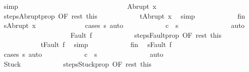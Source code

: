 \begin{isabellebody}
\ simp\isanewline
\ \ \ \ \ \ \ \ \ \ \isamarkupfalse%
\isanewline
\ \ \ \ \ \ \ \ \isamarkupfalse%
\isanewline
\ \ \ \ \ \ \ \ \ \ \isamarkupfalse%
\ {\isacharparenleft}Abrupt\ x{\isacharparenright}\isanewline
\ \ \ \ \ \ \ \ \ \ \isamarkupfalse%
\ steps{\isacharunderscore}Abrupt{\isacharunderscore}prop\ {\isacharbrackleft}OF\ rest\ this{\isacharbrackright}\isanewline
\ \ \ \ \ \ \ \ \ \ \isamarkupfalse%
\ {\isachardoublequoteopen}t{\isacharequal}Abrupt\ x{\isachardoublequoteclose}\ \isamarkupfalse%
\ simp\isanewline
\ \ \ \ \ \ \ \ \ \ \isamarkupfalse%
\ fin\ \isamarkupfalse%
\ {\isachardoublequoteopen}s{\isacharprime}{\isacharequal}Abrupt\ x{\isachardoublequoteclose}\isanewline
\ \ \ \ \ \ \ \ \ \ \ \ \isamarkupfalse%
\ {\isacharparenleft}cases\ s{\isacharprime}{\isacharparenright}\ auto\isanewline
\ \ \ \ \ \ \ \ \ \ \isamarkupfalse%
\ {\isachardoublequoteopen}{\isasymGamma}{\isasymturnstile}c\ {\isasymdown}\ s{\isacharprime}{\isachardoublequoteclose}\ \isanewline
\ \ \ \ \ \ \ \ \ \ \ \ \isamarkupfalse%
\ auto\isanewline
\ \ \ \ \ \ \ \ \isamarkupfalse%
\isanewline
\ \ \ \ \ \ \ \ \ \ \isamarkupfalse%
\ {\isacharparenleft}Fault\ f{\isacharparenright}\isanewline
\ \ \ \ \ \ \ \ \ \ \isamarkupfalse%
\ steps{\isacharunderscore}Fault{\isacharunderscore}prop\ {\isacharbrackleft}OF\ rest\ this{\isacharbrackright}\isanewline
\ \ \ \ \ \ \ \ \ \ \isamarkupfalse%
\ {\isachardoublequoteopen}t{\isacharequal}Fault\ f{\isachardoublequoteclose}\ \isamarkupfalse%
\ simp\isanewline
\ \ \ \ \ \ \ \ \ \ \isamarkupfalse%
\ fin\ \isamarkupfalse%
\ {\isachardoublequoteopen}s{\isacharprime}{\isacharequal}Fault\ f{\isachardoublequoteclose}\isanewline
\ \ \ \ \ \ \ \ \ \ \ \ \isamarkupfalse%
\ {\isacharparenleft}cases\ s{\isacharprime}{\isacharparenright}\ auto\isanewline
\ \ \ \ \ \ \ \ \ \ \isamarkupfalse%
\ {\isachardoublequoteopen}{\isasymGamma}{\isasymturnstile}c\ {\isasymdown}\ s{\isacharprime}{\isachardoublequoteclose}\ \isanewline
\ \ \ \ \ \ \ \ \ \ \ \ \isamarkupfalse%
\ auto\isanewline
\ \ \ \ \ \ \ \ \isamarkupfalse%
\isanewline
\ \ \ \ \ \ \ \ \ \ \isamarkupfalse%
\ Stuck\isanewline
\ \ \ \ \ \ \ \ \ \ \isamarkupfalse%
\ steps{\isacharunderscore}Stuck{\isacharunderscore}prop\ {\isacharbrackleft}OF\ rest\ this{\isacharbrackright}\isanewline

\end{isabellebody}
